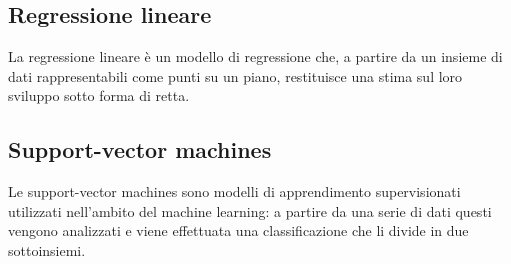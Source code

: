 	\subsection{Regressione lineare}
		La regressione lineare è un modello di regressione che, a partire da un insieme di dati rappresentabili come punti su un piano, restituisce una stima sul loro sviluppo sotto forma di retta.
	\subsection{Support-vector machines}
		Le support-vector machines sono modelli di apprendimento supervisionati utilizzati nell'ambito del machine learning\glo: a partire da una serie di dati questi vengono analizzati e viene effettuata una classificazione che li divide in due sottoinsiemi.



